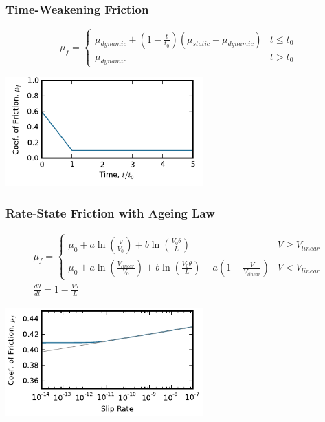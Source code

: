 \documentclass{beamer}
\begin{document}
\begin{frame}
  \frametitle{Time-Weakening Friction}
  
  \begin{equation}
    \mu_f = \left\{ \begin{array}{ll}
        \mu_\mathit{dynamic} + (1 - \frac{t}{t_0})
        (\mu_\mathit{static} -\mu_\mathit{dynamic}) & t \leq t_0 \\
        \mu_\mathit{dynamic} & t > t_0
      \end{array} \right.
  \end{equation}
  \begin{center}
    \includegraphics[height=1.65in]{figs/friction_timeweak}
  \end{center}
  
\end{frame}


\begin{frame}
  \frametitle{Rate-State Friction with Ageing Law}
  
  \begin{gather}
    \mu_f = \left\{ \begin{array}{ll}
        \mu_0 + a \ln (\frac{V}{V_0}) + b \ln (\frac{V_0 \theta}{L}) & V \ge V_\mathit{linear} \\
        \mu_0 + a \ln (\frac{V_\mathit{linear}}{V_0}) + b \ln
        (\frac{V_0\theta}{L}) - a (1 - \frac{V}{V_\mathit{linear}}) & V
        < V_\mathit{linear}
      \end{array} \right. \\
    \frac{d \theta}{dt} = 1 - \frac{V \theta}{L}
  \end{gather}
  \begin{center}
    \includegraphics[height=1.65in]{figs/friction_ratestate}
  \end{center}
  
\end{frame}
\end{document}
